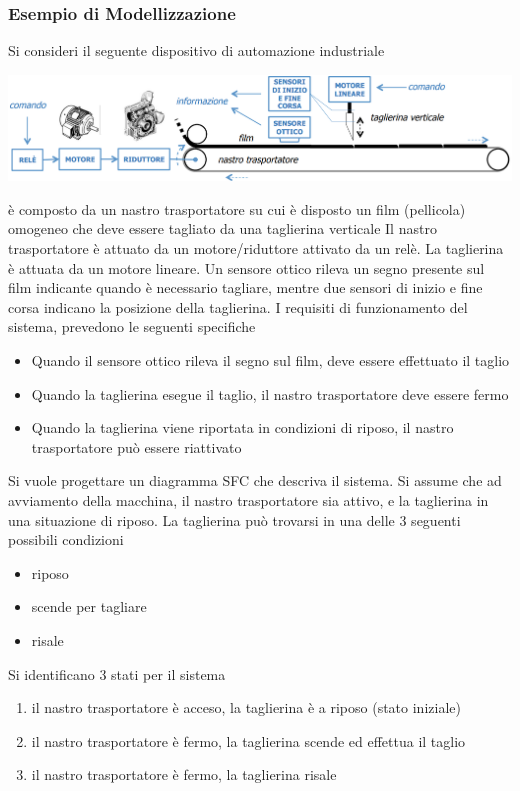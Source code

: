 \documentclass[10pt, letterpaper]{report}
\begin{document}
\subsubsection{Esempio di Modellizzazione}
Si consideri il seguente dispositivo di automazione industriale
\begin{center}
    \includegraphics[width=1\textwidth ]{images/nastroSFC.png}
\end{center}
è composto da un nastro trasportatore su
cui è disposto un film (pellicola) omogeneo che deve essere tagliato da una taglierina verticale
Il nastro trasportatore è attuato da un motore/riduttore attivato da un relè. La
taglierina è attuata da un motore lineare. Un sensore ottico rileva un segno presente
sul film indicante quando è necessario tagliare, mentre due sensori di inizio e fine
corsa indicano la posizione della taglierina.
\acc 
I requisiti di funzionamento del sistema, prevedono le seguenti specifiche \begin{itemize}
    \item Quando il sensore ottico rileva il segno sul film, deve essere effettuato il taglio 
    \item Quando la taglierina esegue il taglio, il nastro trasportatore deve essere fermo 
    \item Quando la taglierina viene riportata in condizioni di riposo, il nastro trasportatore può
    essere riattivato
\end{itemize}
Si vuole progettare un diagramma SFC che descriva il sistema. Si assume che ad avviamento della macchina, il nastro trasportatore sia attivo, e la taglierina in una situazione di riposo. La taglierina può trovarsi in una delle 3 seguenti possibili condizioni\begin{itemize}
    \item riposo 
    \item scende per tagliare 
    \item risale
\end{itemize}
Si identificano 3 stati per il sistema\begin{enumerate}
    \item il nastro trasportatore è acceso, la taglierina è a riposo (stato iniziale)
    \item il nastro trasportatore è fermo, la taglierina scende ed effettua il taglio 
    \item il nastro trasportatore è fermo, la taglierina risale
\end{enumerate}
\end{document}
